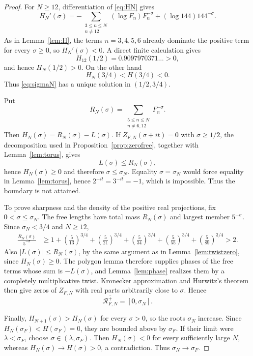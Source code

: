 \documentclass[11pt]{article}
\theoremstyle{remark}
\newcommand{\ZFN}{Z_{F,N}}
\begin{document}
\begin{proof}
For $N\ge12$, differentiation of \eqref{eq:HN} gives
\[
H_N'(\sigma)
=-\!\sum_{\substack{3\le n\le N\\ n\ne12}}
(\log F_n)F_n^{-\sigma}
+(\log144)144^{-\sigma}.
\]
As in Lemma~\ref{lem:H}, the terms $n=3,4,5,6$ already dominate the positive term for every $\sigma\ge0$, so $H_N'(\sigma)<0$.  A direct finite calculation gives
\[
H_{12}(1/2)=0.9097970371\ldots>0,
\]
and hence $H_N(1/2)>0$.  On the other hand
\[
H_N(3/4)<H(3/4)<0.
\]
Thus \eqref{eq:sigmaN} has a unique solution in $(1/2,3/4)$.

Put
\[
R_N(\sigma)=\sum_{\substack{5\le n\le N\\n\ne6,12}}F_n^{-\sigma}.
\]
Then $H_N(\sigma)=R_N(\sigma)-L(\sigma)$.  If $\ZFN(\sigma+it)=0$ with $\sigma\ge1/2$, the decomposition used in Proposition~\ref{prop:zerofree}, together with Lemma~\ref{lem:torus}, gives
\[
L(\sigma)\le R_N(\sigma),
\]
hence $H_N(\sigma)\ge0$ and therefore $\sigma\le\sigma_N$.  Equality $\sigma=\sigma_N$ would force equality in Lemma~\ref{lem:torus}, hence $2^{-it}=3^{-it}=-1$, which is impossible.  Thus the boundary is not attained.

To prove sharpness and the density of the positive real projections, fix $0<\sigma\le\sigma_N$.  The free lengths have total mass $R_N(\sigma)$ and largest member $5^{-\sigma}$.  Since $\sigma_N<3/4$ and $N\ge12$,
\begin{align*}
\frac{R_N(\sigma)}{5^{-\sigma}}
&\ge 1+\left(\frac5{13}\right)^{3/4}
       +\left(\frac5{21}\right)^{3/4}
       +\left(\frac5{34}\right)^{3/4}
       +\left(\frac5{55}\right)^{3/4}
       +\left(\frac5{89}\right)^{3/4}>2.
\end{align*}
Also $|L(\sigma)|\le R_N(\sigma)$, by the same argument as in Lemma~\ref{lem:twistzero}, since $H_N(\sigma)\ge0$.  The polygon lemma therefore supplies phases of the free terms whose sum is $-L(\sigma)$, and Lemma~\ref{lem:phase} realizes them by a completely multiplicative twist.  Kronecker approximation and Hurwitz's theorem then give zeros of $\ZFN$ with real parts arbitrarily close to $\sigma$.  Hence
\[
\overline{\mathcal R_{F,N}^{+}}=[0,\sigma_N].
\]

Finally, $H_{N+1}(\sigma)>H_N(\sigma)$ for every $\sigma>0$, so the roots $\sigma_N$ increase.  Since $H_N(\sigma_F)<H(\sigma_F)=0$, they are bounded above by $\sigma_F$.  If their limit were $\lambda<\sigma_F$, choose $\sigma\in(\lambda,\sigma_F)$.  Then $H_N(\sigma)<0$ for every sufficiently large $N$, whereas $H_N(\sigma)\to H(\sigma)>0$, a contradiction.  Thus $\sigma_N\to\sigma_F$.
\end{proof}
\end{document}
